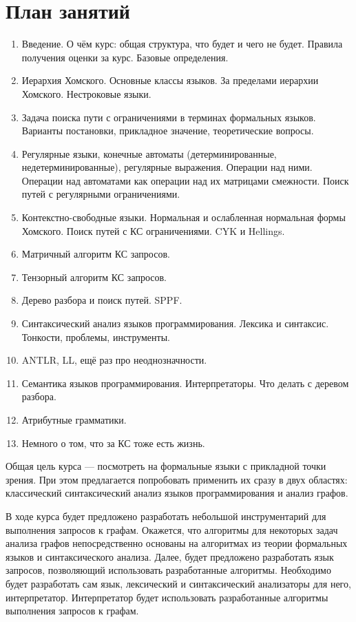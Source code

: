 \section{План занятий}
\begin{enumerate}
  \item Введение. О чём курс: общая структура, что будет и чего не будет. Правила получения оценки за курс. Базовые определения.
  \item Иерархия Хомского. Основные классы языков. За пределами иерархии Хомского. Нестроковые языки.
  \item Задача поиска пути с ограничениями в терминах формальных языков. Варианты постановки, прикладное значение, теоретические вопросы.  
  \item Регулярные языки, конечные автоматы (детерминированные, недетерминированные), регулярные выражения. Операции над ними. Операции над автоматами как операции над их матрицами смежности. Поиск путей с регулярными ограничениями.
  \item Контекстно-свободные языки. Нормальная и ослабленная нормальная формы Хомского. Поиск путей с КС ограничениями. CYK и Hellings.
  \item Матричный алгоритм КС запросов.
  \item Тензорный алгоритм КС запросов.
  \item Дерево разбора и поиск путей. SPPF. 
  \item Синтаксический анализ языков программирования. Лексика и синтаксис. Тонкости, проблемы, инструменты.
  \item ANTLR, LL, ещё раз про неоднозначности.
  \item Семантика языков программирования. Интерпретаторы. Что делать с деревом разбора. 
  \item Атрибутные грамматики.
  \item Немного о том, что за КС тоже есть жизнь.
\end{enumerate}


Общая цель курса --- посмотреть на формальные языки с прикладной точки зрения. При этом предлагается попробовать применить их сразу в двух областях: классический синтаксический анализ языков программирования и анализ графов.

В ходе курса будет предложено разработать небольшой инструментарий для выполнения запросов к графам. Окажется, что алгоритмы для некоторых задач анализа графов непосредственно основаны на алгоритмах из теории формальных языков и синтаксического анализа. Далее, будет предложено разработать язык запросов, позволяющий использовать разработанные алгоритмы. Необходимо будет разработать сам язык, лексический и синтаксический  анализаторы для него, интерпретатор. Интерпретатор будет использовать разработанные алгоритмы выполнения запросов к графам.

